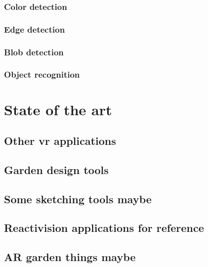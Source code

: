 			\subsubsection{Color detection}
			\subsubsection{Edge detection}
			\subsubsection{Blob detection}
			\subsubsection{Object recognition}

    \section{State of the art}\label{sec:SOTA}
		\subsection{Other vr applications}
		\subsection{Garden design tools}
		\subsection{Some sketching tools maybe}
		\subsection{Reactivision applications for reference}
		\subsection{AR garden things maybe}